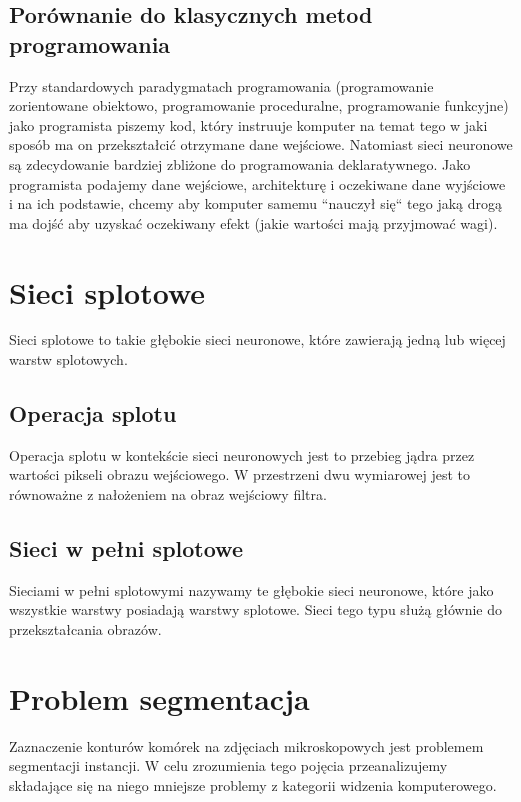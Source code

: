 \documentclass{article}
\begin{document}
\subsection{Porównanie do klasycznych metod programowania}
Przy standardowych paradygmatach programowania (programowanie zorientowane obiektowo, programowanie proceduralne, programowanie funkcyjne) jako programista piszemy kod, który
instruuje komputer na temat tego w jaki sposób ma on przekształcić otrzymane dane wejściowe.
Natomiast sieci neuronowe są zdecydowanie bardziej zbliżone do programowania deklaratywnego. Jako programista podajemy dane wejściowe, architekturę i oczekiwane dane wyjściowe i
na ich podstawie, chcemy aby komputer samemu ``nauczył się`` tego jaką drogą ma dojść aby uzyskać oczekiwany efekt (jakie wartości mają przyjmować wagi).
\newpage
\section{Sieci splotowe}
Sieci splotowe to takie głębokie sieci neuronowe, które zawierają jedną lub więcej warstw splotowych.
\subsection{Operacja splotu}
Operacja splotu w kontekście sieci neuronowych jest to przebieg jądra przez wartości pikseli obrazu wejściowego.
W przestrzeni dwu wymiarowej jest to równoważne z nałożeniem na obraz wejściowy filtra.
\subsection{Sieci w pełni splotowe}
Sieciami w pełni splotowymi nazywamy te głębokie sieci neuronowe, które jako wszystkie warstwy posiadają warstwy splotowe.
Sieci tego typu służą głównie do przekształcania obrazów.
\newpage
\section{Problem segmentacja}
Zaznaczenie konturów komórek na zdjęciach mikroskopowych jest problemem segmentacji instancji.
W celu zrozumienia tego pojęcia przeanalizujemy składające się na niego mniejsze problemy z kategorii widzenia komputerowego.
\end{document}
